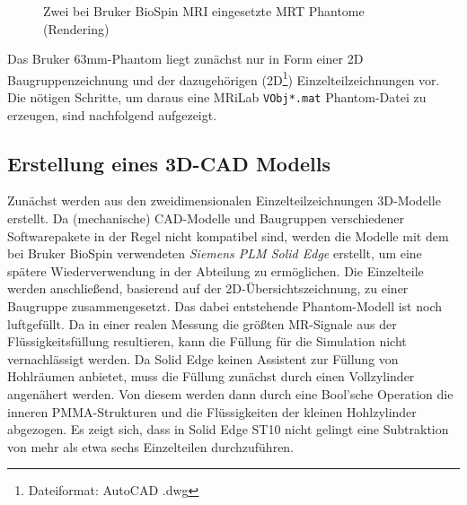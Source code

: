 \begin{figure}[H]
	\centering
	\hfill
	\caption{Zwei bei Bruker BioSpin MRI eingesetzte MRT Phantome (Rendering)}
\end{figure}

Das Bruker 63mm-Phantom liegt zunächst nur in Form einer 2D Baugruppenzeichnung und der dazugehörigen (2D\footnote{Dateiformat: AutoCAD .dwg}) Einzelteilzeichnungen vor. Die nötigen Schritte, um daraus eine MRiLab \texttt{VObj*.mat} Phantom-Datei zu erzeugen, sind nachfolgend aufgezeigt.

\subsection{Erstellung eines 3D-CAD Modells}
Zunächst werden aus den zweidimensionalen Einzelteilzeichnungen 3D-Modelle erstellt. Da (mechanische) CAD-Modelle und Baugruppen verschiedener Softwarepakete in der Regel nicht kompatibel sind, werden die Modelle mit dem bei Bruker BioSpin verwendeten \textit{Siemens PLM Solid Edge} erstellt, um eine spätere Wiederverwendung in der Abteilung zu ermöglichen. Die Einzelteile werden anschließend, basierend auf der 2D-Übersichtszeichnung, zu einer Baugruppe zusammengesetzt. Das dabei entstehende Phantom-Modell ist noch luftgefüllt. Da in einer realen Messung die größten MR-Signale aus der Flüssigkeitsfüllung resultieren, kann die Füllung für die Simulation nicht vernachlässigt werden. Da Solid Edge keinen Assistent zur Füllung von Hohlräumen anbietet, muss die Füllung zunächst durch einen Vollzylinder angenähert werden. Von diesem werden dann durch eine Bool'sche Operation die inneren PMMA-Strukturen und die Flüssigkeiten der kleinen Hohlzylinder abgezogen. Es zeigt sich, dass in Solid Edge ST10 nicht gelingt eine Subtraktion von mehr als etwa sechs Einzelteilen durchzuführen.

